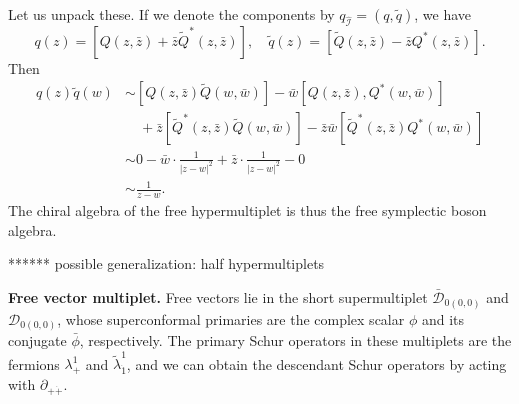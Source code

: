 \documentclass[a4paper,11pt]{article}
\begin{document}
Let us unpack these. If we denote the components by $q_{\hat{\mathcal{I}}} = (q, \tilde{q})$, we have
\begin{equation}
    q(z) = [Q(z, \bar{z}) + \bar{z} \widetilde{Q}^*(z, \bar{z})], \quad \tilde{q}(z) = [\widetilde{Q}(z, \bar{z}) - \bar{z} Q^*(z, \bar{z}) ].
\end{equation}
Then
\begin{equation}
\begin{aligned}
    q(z) \tilde{q}(w) &\sim [Q(z, \bar{z}) \widetilde{Q}(w, \bar{w})] - \bar{w} [Q(z, \bar{z}), Q^*(w, \bar{w})] \\
    & \quad + \bar{z} [\widetilde{Q}^*(z, \bar{z})\widetilde{Q}(w, \bar{w})] - \bar{z} \bar{w} [\widetilde{Q}^*(z, \bar{z}) Q^*(w,\bar{w})]\\
    &\sim 0 - \bar{w} \cdot \frac{1}{|z-w|^2} + \bar{z} \cdot \frac{1}{|z-w|^2} - 0\\
    &\sim \frac{1}{z-w}.
\end{aligned}
\end{equation}
The chiral algebra of the free hypermultiplet is thus the free symplectic boson algebra.

****** possible generalization: half hypermultiplets

\bigskip
\noindent \textbf{Free vector multiplet.} Free vectors lie in the short supermultiplet $\bar{\mathcal{D}}_{0(0,0)}$ and $\mathcal{D}_{0(0,0)}$, whose superconformal primaries are the complex scalar $\phi$ and its conjugate $\bar{\phi}$, respectively. The primary Schur operators in these multiplets are the fermions $\lambda_+^1$ and $\tilde{\lambda}_{\dot{1}}^1$, and we can obtain the descendant Schur operators by acting with $\partial_{+\dot{+}}$.
\end{document}
